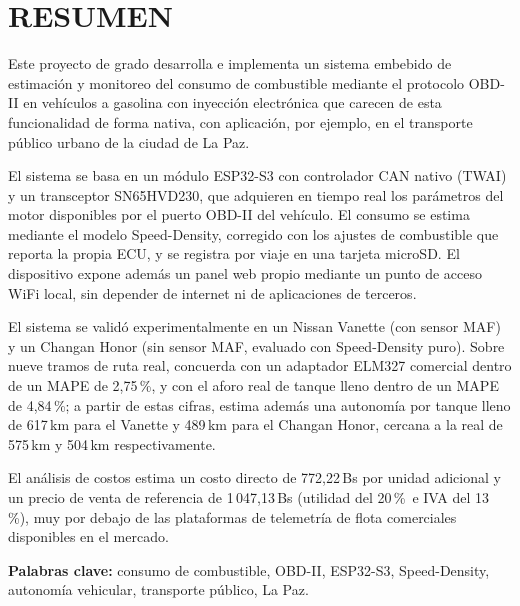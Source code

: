 \chapter*{RESUMEN}

Este proyecto de grado desarrolla e implementa un sistema embebido de estimación y monitoreo del consumo de combustible mediante el protocolo OBD-II en vehículos a gasolina con inyección electrónica que carecen de esta funcionalidad de forma nativa, con aplicación, por ejemplo, en el transporte público urbano de la ciudad de La Paz.

El sistema se basa en un módulo ESP32-S3 con controlador CAN nativo (TWAI) y un transceptor SN65HVD230, que adquieren en tiempo real los parámetros del motor disponibles por el puerto OBD-II del vehículo. El consumo se estima mediante el modelo Speed-Density, corregido con los ajustes de combustible que reporta la propia ECU, y se registra por viaje en una tarjeta microSD. El dispositivo expone además un panel web propio mediante un punto de acceso WiFi local, sin depender de internet ni de aplicaciones de terceros.

El sistema se validó experimentalmente en un Nissan Vanette (con sensor MAF) y un Changan Honor (sin sensor MAF, evaluado con Speed-Density puro). Sobre nueve tramos de ruta real, concuerda con un adaptador ELM327 comercial dentro de un MAPE de 2,75\,\%, y con el aforo real de tanque lleno dentro de un MAPE de 4,84\,\%; a partir de estas cifras, estima además una autonomía por tanque lleno de 617\,km para el Vanette y 489\,km para el Changan Honor, cercana a la real de 575\,km y 504\,km respectivamente.

El análisis de costos estima un costo directo de 772,22\,Bs por unidad adicional y un precio de venta de referencia de 1\,047,13\,Bs (utilidad del 20\,\%~e IVA del 13\,\%), muy por debajo de las plataformas de telemetría de flota comerciales disponibles en el mercado.

\textbf{Palabras clave:} consumo de combustible, OBD-II, ESP32-S3, Speed-Density, autonomía vehicular, transporte público, La Paz.
